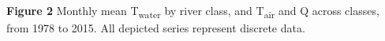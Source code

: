 \documentclass[notitlepage]{article}
\begin{document}
\begin{center}
\end{center}
\noindent
\textbf{Figure 2} Monthly mean T\textsubscript{water} by river class, and T\textsubscript{air} and Q across classes, from 1978 to 2015. All depicted series represent discrete data. %
\\[\baselineskip]
\end{document}

